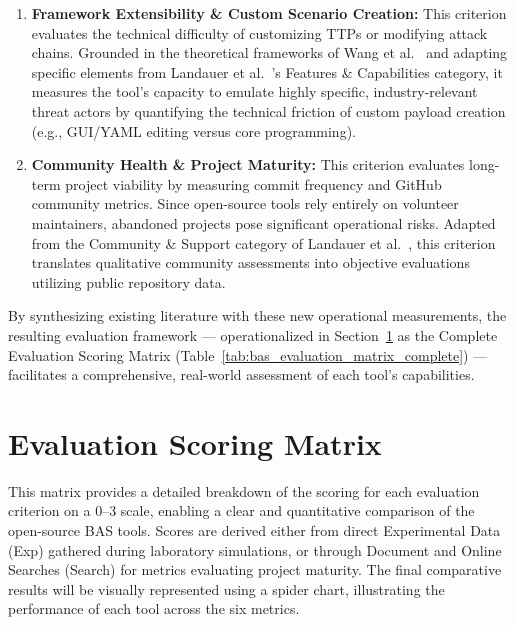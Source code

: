 \begin{enumerate}
    \item \textbf{Framework Extensibility \& Custom Scenario Creation:} This criterion evaluates the technical difficulty of customizing TTPs or modifying attack chains. Grounded in the theoretical frameworks of Wang et al.~\cite{wang2025} and adapting specific elements from Landauer et al.~\cite{landauer2024}'s Features \& Capabilities category, it measures the tool's capacity to emulate highly specific, industry-relevant threat actors by quantifying the technical friction of custom payload creation (e.g., GUI/YAML editing versus core programming).

    \item \textbf{Community Health \& Project Maturity:} This criterion evaluates long-term project viability by measuring commit frequency and GitHub community metrics. Since open-source tools rely entirely on volunteer maintainers, abandoned projects pose significant operational risks. Adapted from the Community \& Support category of Landauer et al.~\cite{landauer2024}, this criterion translates qualitative community assessments into objective evaluations utilizing public repository data.
\end{enumerate}

By synthesizing existing literature with these new operational measurements, the resulting evaluation framework — operationalized in Section~\ref{sec:Scoring} as the Complete Evaluation Scoring Matrix (Table~\ref{tab:bas_evaluation_matrix_complete}) — facilitates a comprehensive, real-world assessment of each tool's capabilities.

\section{Evaluation Scoring Matrix}\label{sec:Scoring}
This matrix provides a detailed breakdown of the scoring for each evaluation criterion on a 0–3 scale, enabling a clear and quantitative comparison of the open-source BAS tools. Scores are derived either from direct Experimental Data (Exp) gathered during laboratory simulations, or through Document and Online Searches (Search) for metrics evaluating project maturity. The final comparative results will be visually represented using a spider chart, illustrating the performance of each tool across the six metrics.


